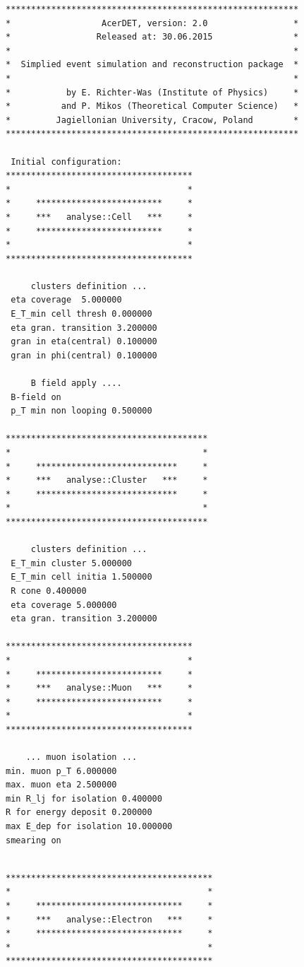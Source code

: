 {\scriptsize
\begin{verbatim}  
**********************************************************
*                  AcerDET, version: 2.0                 *
*                 Released at: 30.06.2015                *
*                                                        *
*  Simplied event simulation and reconstruction package  *
*                                                        *
*           by E. Richter-Was (Institute of Physics)     *
*          and P. Mikos (Theoretical Computer Science)   *
*         Jagiellonian University, Cracow, Poland        *
**********************************************************

 Initial configuration:
*************************************
*                                   *
*     *************************     *
*     ***   analyse::Cell   ***     *
*     *************************     *
*                                   *
*************************************

	 clusters definition ...
 eta coverage  5.000000
 E_T_min cell thresh 0.000000
 eta gran. transition 3.200000
 gran in eta(central) 0.100000
 gran in phi(central) 0.100000

	 B field apply ....
 B-field on
 p_T min non looping 0.500000

****************************************
*                                      *
*     ****************************     *
*     ***   analyse::Cluster   ***     *
*     ****************************     *
*                                      *
****************************************

	 clusters definition ...
 E_T_min cluster 5.000000
 E_T_min cell initia 1.500000
 R cone 0.400000
 eta coverage 5.000000
 eta gran. transition 3.200000

*************************************
*                                   *
*     *************************     *
*     ***   analyse::Muon   ***     *
*     *************************     *
*                                   *
*************************************

	... muon isolation ...
min. muon p_T 6.000000
max. muon eta 2.500000
min R_lj for isolation 0.400000
R for energy deposit 0.200000
max E_dep for isolation 10.000000
smearing on
\end{verbatim}  
\newpage
\begin{verbatim}

*****************************************
*                                       *
*     *****************************     *
*     ***   analyse::Electron   ***     *
*     *****************************     *
*                                       *
*****************************************


\end{verbatim}}
